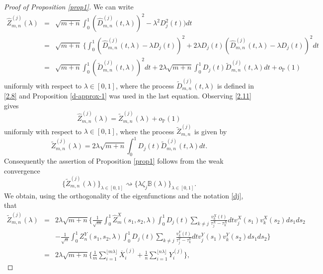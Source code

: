 \documentclass[11pt]{article}
\numberwithin{equation}{section}
\numberwithin{theorem}{section}
\numberwithin{lemma}{section}
\numberwithin{proposition}{section}
\numberwithin{cor}{section}
\numberwithin{definition}{section}
\numberwithin{cons}{section}
\numberwithin{rem}{section}
\numberwithin{exa}{section}
\numberwithin{table}{section}
\numberwithin{figure}{section}
\numberwithin{algo}{section}
\begin{document}
{{\begin{proof}[Proof of Proposition \ref{prop1}]
We can write
\begin{eqnarray} \label{2.10}
 \hat Z^{(j)}_{m,n} (\lambda) &=& \sqrt{m+n} \int^1_0 (\hat D^{(j)}_{m,n} (t,\lambda))^2 - \lambda^2 D^2_j(t))dt \\ \nonumber
    &=& \sqrt{m+n} \ \Big \{ \int^1_0 (\hat D^{(j)}_{m,n}(t,\lambda) - \lambda D_j(t))^2 + 2 \lambda D_j(t) (\hat D^{(j)}_{m,n} (t,\lambda) - \lambda D_j(t))^2 dt \\ \nonumber
    &=& \sqrt{m+n} \int^1_0  (\tilde D^{(j)}_{m,n} (t,\lambda))^2 dt + 2 \lambda \sqrt{m+n} \int^1_0 D_j(t) \tilde D_{m,n} ^{(j)}(t, \lambda)dt + o_{\mathbb{P}}(1)
\end{eqnarray}
uniformly with respect to $\lambda \in [0,1]$,
where the process $\tilde D_{m,n}^{(j)}(t, \lambda)$ is defined in \eqref{2.8} and Proposition \ref{d-approx-1} was used in the  last equation.
Observing  \eqref{2.11}  gives
\begin{equation}\label{2.12}
 \hat Z^{(j)}_{m,n} (\lambda) = \tilde Z^{(j)}_{m,n} (\lambda) + o_{\mathbb{P}}(1)
\end{equation}
uniformly with respect to $\lambda \in [0,1]$,  where the process $\tilde Z_{m,n}^{(j)}$ is given by
\begin{equation}\label{2.14}
  \tilde Z^{(j)}_{m,n} (\lambda) = 2 \lambda \sqrt{m+n}  \int^1_0 D_j(t) \tilde D^{(j)}_{m,n} (t,\lambda) dt .
\end{equation}
 Consequently the assertion of Proposition \ref{prop1} follows from the weak convergence
 $$
  \{ \tilde Z^{(j)}_{m,n} (\lambda) \}_{\lambda \in [0,1]} \rightsquigarrow \{ \lambda \zeta_j \mathbb{B} (\lambda) \}_{\lambda \in [0,1]}.
  $$
We obtain, using the orthogonality of the eigenfunctions and the notation \eqref{dj},  that
\begin{eqnarray}\label{z-mn-def}
\nonumber
  \tilde{Z}^{(j)}_{m,n} (\lambda) &=& 2 \lambda \sqrt{m+n} \Big \{ \frac {1}{\sqrt{m}} \int^1_0 \hat Z^X_m (s_1, s_2, \lambda) \int^1_0 D_j(t) \sum_{k \neq j} \frac {v^X_k(t)}{\tau^X_j - \tau^X_k}  dt v^X_j (s_1) v^X_k (s_2) ds_1 ds_2 \\ \nonumber
    &&-   \frac {1}{\sqrt{n}} \int^1_0 Z^Y_n (s_1, s_2, \lambda) \int^1_0 D_j(t) \sum_{k \neq j} \frac {v^Y_k(t)}{\tau^Y_j - \tau^Y_k}    dt v^Y_j (s_1) v^Y_k(s_2) ds_1ds_2 \Big \} \\ \label{2.16}
    &=& 2 \lambda \sqrt{m+n} \Big \{ \frac {1}{m} \sum_{i=1}^{\lfloor m \lambda \rfloor} \overline{X}_i^{(j)} + \frac {1}{n} \sum_{i=1}^{\lfloor n \lambda \rfloor} Y_i^{(j)} \Big \},

\end{eqnarray}
\end{proof}}}
\end{document}

